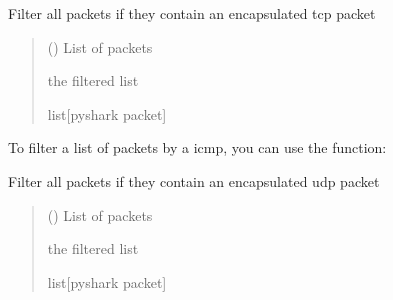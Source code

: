 \documentclass[letterpaper,10pt,english,openany,oneside]{sphinxmanual}
\begin{document}
\begin{fulllineitems}
\label{\detokenize{index:pktsniffer.filter_by_udp}}
\pysigstartsignatures
\pysiglinewithargsret
{}
{}
{}
\pysigstopsignatures
\sphinxAtStartPar
Filter all packets if they contain an encapsulated tcp packet
\begin{quote}\begin{description}
\sphinxAtStartPar
{} (\sphinxstyleliteralemphasis{\sphinxupquote{{[}}}\sphinxstyleliteralemphasis{\sphinxupquote{{]}}}) \textendash{} List of packets

\sphinxAtStartPar
the filtered list

\sphinxAtStartPar
list{[}pyshark packet{]}

\end{description}\end{quote}

\end{fulllineitems}


\sphinxAtStartPar
To filter a list of packets by a icmp, you can
use the  function:

\begin{fulllineitems}
\label{\detokenize{index:pktsniffer.filter_by_icmp}}
\pysigstartsignatures
\pysiglinewithargsret
{}
{}
{}
\pysigstopsignatures
\sphinxAtStartPar
Filter all packets if they contain an encapsulated udp packet
\begin{quote}\begin{description}
\sphinxAtStartPar
{} (\sphinxstyleliteralemphasis{\sphinxupquote{{[}}}\sphinxstyleliteralemphasis{\sphinxupquote{{]}}}) \textendash{} List of packets

\sphinxAtStartPar
the filtered list

\sphinxAtStartPar
list{[}pyshark packet{]}

\end{description}\end{quote}

\end{fulllineitems}
\end{document}
